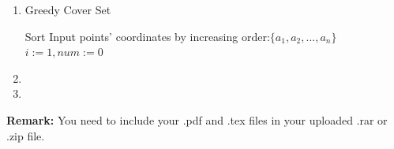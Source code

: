 \documentclass[12pt,a4paper]{article}
\makeatletter
\newtheorem*{solution}{Solution}
\theoremstyle{definition}
\renewenvironment{solution}[1][Solution] {\par\pushQED{\qed}\normalfont\topsep6\p@\@plus6\p@\relax\trivlist\item[\hskip\labelsep\bfseries#1\@addpunct{.}]\ignorespaces}{\popQED\endtrivlist\@endpefalse} \makeatother
\makeatother
\begin{document}
\begin{enumerate}
\begin{solution}
\begin{enumerate}
\begin{algorithm}[H]
   \caption{Greedy Cover Set}\label{alg cover}
		Sort Input points' coordinates by increasing order:$\{a_1, a_2,...,a_n\}$\;
		$i:=1, num:=0$\;
	\end{algorithm}
\end{enumerate}
 \end{solution}

\item

\item


\end{enumerate}



\vspace{20pt}

\textbf{Remark:} You need to include your .pdf and .tex files in your uploaded .rar or .zip file.

\end{document}
